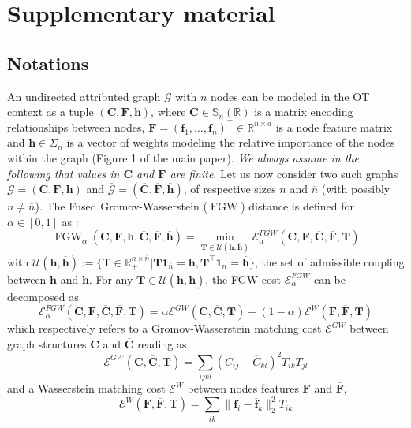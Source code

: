 \documentclass{article}
\def\vf{{\bm{f}}}
\def\vh{{\bm{h}}}
\def\mC{{\bm{C}}}
\def\mF{{\bm{F}}}
\def\mT{{\bm{T}}}
\def\sR{{\mathbb{R}}}
\def\sS{{\mathbb{S}}}
\newcommand{\R}{\mathbb{R}}
\newcommand{\FGW}{\operatorname{FGW}}
\begin{document}
{\section{Supplementary material}
	
\subsection{Notations}\label{subsec:notations}

An undirected attributed graph $\mathcal{G}$ with $n$ nodes can be modeled in
the OT context as a tuple $(\mC, \mF, \vh)$, where $\mC \in \sS_n(\sR)$ is a
matrix encoding relationships between nodes, $\mF = (\vf_1,..., \vf_n)^\top \in
\R^{n \times d}$ is a node feature matrix and $\vh \in \Sigma_n$ is a vector of
weights modeling the relative importance of the nodes within the graph (Figure
1 of the main paper). \emph{We always assume in the following that values in $\mC$ and $\mF$ are finite}. Let us now consider two such graphs $\mathcal{G}=(\mC, \mF, \vh)$
and $\overline{\mathcal{G}}=(\overline{\mC}, \overline{\mF}, \overline{\vh})$, of respective sizes $n$
and $\overline{n}$ (with possibly $n \neq \overline{n}$). The Fused
Gromov-Wasserstein ($\FGW$) distance is defined for $\alpha \in [0, 1]$ as
\cite{vayer2020fused, titouan2019optimal}:
\begin{equation} \label{eq:FGW_supp}
\FGW_{\alpha}(\mC, \mF, \vh, \overline{\mC}, \overline{\mF}, \overline{\vh}) = \min_{\mT \in \mathcal{U}(\vh, \overline{\vh})} \mathcal{E}^{FGW}_{\alpha}(\mC, \mF, \overline{\mC}, \overline{\mF}, \mT)  
\end{equation}
with $\mathcal{U}(\vh, \overline{\vh}) := \{\mT \in \R_+^{n \times
	\overline{n}} | \mT \bm{1}_{\overline{n}} = \vh, \mT^\top \bm{1}_n =
\overline{\vh}\}$, the set of admissible coupling between $\vh$ and
$\overline{\vh}$. For any $\mT \in \mathcal{U}(\vh, \overline{\vh})$, the FGW cost $\mathcal{E}^{FGW}_\alpha$ can be decomposed as 
\begin{equation}\label{eq:FGWcost_supp1}
\mathcal{E}^{FGW}_{\alpha}(\mC, \mF, \overline{\mC}, \overline{\mF}, \mT)  =	\alpha \mathcal{E}^{GW}(\mC, \overline{\mC}, \mT) + (1-\alpha) \mathcal{E}^{W}(\mF, \overline{\mF},\mT)
\end{equation}
which respectively refers to a Gromov-Wasserstein matching cost $\mathcal{E}^{GW}$ between graph structures $\mC$ and $\overline{\mC}$ reading as
\begin{equation}\label{eq:GWcost_supp1}
\mathcal{E}^{GW}(\mC, \overline{\mC}, \mT) = \sum_{ijkl} (C_{ij} - \overline{C}_{kl})^2  T_{ik} T_{jl}
\end{equation}
and a Wasserstein matching cost $\mathcal{E}^{W}$ between nodes features $\mF$ and $\overline{\mF}$,
\begin{equation}\label{eq:Wcost_supp1}
\mathcal{E}^{W}(\mF, \overline{\mF}, \mT) = \sum_{ik} \| \vf_i -\overline{\vf}_k \|_2^2 T_{ik}
\end{equation}
}
\end{document}
